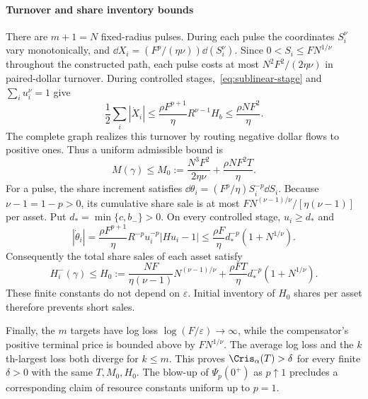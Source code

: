 \documentclass[review,hidelinks,onefignum,onetabnum]{siamonline250211}
\begin{document}
\paragraph{Turnover and share inventory bounds}
There are $m+1=N$ fixed-radius pulses.
During each pulse the coordinates $S_i^\nu$
vary monotonically, and
$\dd X_i=(F^p/(\eta\nu))\dd(S_i^\nu)$.
Since $0<S_i\le FN^{1/\nu}$ throughout
the constructed path, each pulse costs at most
$N^2F^2/(2\eta\nu)$ in paired-dollar turnover.
During controlled stages,~\eqref{eq:sublinear-stage}
and $\sum_i u_i^\nu=1$ give
\[
\frac12\sum_i|\dot X_i|
\le\frac{\rho F^{p+1}}{\eta}R^{\nu-1}H_b
\le\frac{\rho NF^2}{\eta}.
\]
The complete graph realizes this turnover by
routing negative dollar flows to positive ones.
Thus a uniform admissible bound is
\[
M(\gamma)\le M_0:=
\frac{N^3F^2}{2\eta\nu}
+\frac{\rho NF^2T}{\eta}.
\]
For a pulse, the share increment satisfies
$\dd\theta_i=(F^p/\eta)S_i^{-p}\dd S_i$.
Because $\nu-1=1-p>0$, its cumulative share
sale is at most
$FN^{(\nu-1)/\nu}/[\eta(\nu-1)]$ per asset.
Put $d_*=\min\{c,b_-\}>0$.
On every controlled stage, $u_i\ge d_*$ and
\[
|\dot\theta_i|=
\frac{\rho F^{p+1}}{\eta}
R^{-p}u_i^{-p}|Hu_i-1|
\le\frac{\rho F}{\eta}
d_*^{-p}(1+N^{1/\nu}).
\]
Consequently the total share sales of each
asset satisfy
\begin{equation}\label{eq:sublinear-inventory}
H_i^-(\gamma)\le H_0:=
\frac{NF}{\eta(\nu-1)}N^{(\nu-1)/\nu}
+\frac{\rho FT}{\eta}
d_*^{-p}(1+N^{1/\nu}).
\end{equation}
These finite constants do not depend on
$\varepsilon$. Initial inventory of $H_0$
shares per asset therefore prevents short sales.

Finally, the $m$ targets have log loss
$\log(F/\varepsilon)\to\infty$, while the
compensator's positive terminal price is bounded
above by $FN^{1/\nu}$. The average log loss
and the $k$th-largest loss both diverge for
$k\le m$. This proves
$\Cris_\alpha(T)>\delta$ for every finite
$\delta>0$ with the same $T,M_0,H_0$.
The blow-up of $\Psi_p(0^+)$ as $p\uparrow1$
precludes a corresponding claim of resource
constants uniform up to $p=1$.




\end{document}

